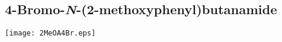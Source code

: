 %
%
%

\subsection{4\hyp{}Bromo\hyp{}\textit{N}\hyp{}(2\hyp{}methoxyphenyl)butanamide }


\begin{scheme}[H]
	\begin{center}
		\texttt{[image: 2MeOA4Br.eps]}
	\end{center}
\end{scheme}

